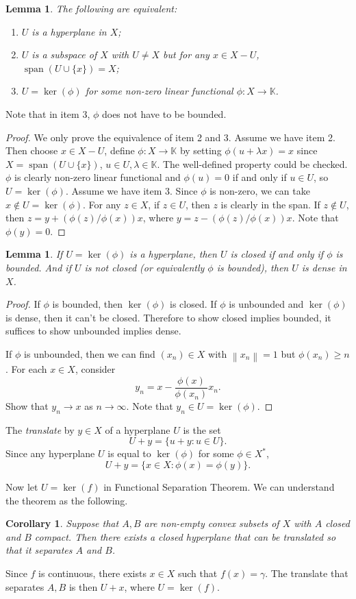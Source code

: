 \documentclass[12pt,a4paper]{report}
\numberwithin{equation}{section}
\theoremstyle{mystyle}
\newtheorem{lemma}[definition]{Lemma}
\newtheorem{corollary}[definition]{Corollary}
\newcommand{\K}{\mathbb{K}}
\newcommand{\norm}[1]{\left\lVert #1 \right\rVert}
\newcommand{\spn}{\operatorname{span}}
\begin{document}
	\begin{lemma}
		The following are equivalent:
		\begin{enumerate}
			\item $U$ is a hyperplane in $X$;
			\item $U$ is a subspace of $X$ with $U\neq X$ but for any $x\in X-U$, $\spn(U\cup \{x\})=X$;
			\item $U=\ker(\phi)$ for some non-zero linear functional $\phi:X\to\K$.
		\end{enumerate}
	\end{lemma}
	Note that in item 3, $\phi$ does not have to be bounded.
	\begin{proof}
		We only prove the equivalence of item 2 and 3. Assume we have item 2. Then choose $x\in X-U$, define $\phi:X\to\K$ by setting $\phi(u+\lambda x)=x$ since $X=\spn(U\cup \{x\})$, $u\in U, \lambda\in\K$. The well-defined property could be checked. $\phi$ is clearly non-zero linear functional and $\phi(u)=0$ if and only if $u\in U$, so $U=\ker(\phi)$. Assume we have item 3. Since $\phi$ is non-zero, we can take $x\notin U=\ker(\phi)$. For any $z\in X$, if $z\in U$, then $z$ is clearly in the span. If $z\notin U$, then $z=y+(\phi(z)/\phi(x))x$, where $y=z-(\phi(z)/\phi(x))x$. Note that $\phi(y)=0$.
	\end{proof}
	
	\begin{lemma}
		If $U=\ker(\phi)$ is a hyperplane, then $U$ is closed if and only if $\phi$ is bounded. And if $U$ is not closed (or equivalently $\phi$ is bounded), then $U$ is dense in $X$.
	\end{lemma}
	\begin{proof}
		If $\phi$ is bounded, then $\ker(\phi)$ is closed. If $\phi$ is unbounded and $\ker(\phi)$ is dense, then it can't be closed. Therefore to show closed implies bounded, it suffices to show unbounded implies dense.
		
		If $\phi$ is unbounded, then we can find $(x_n)\in X$ with $\norm{x_n}=1$ but $\phi(x_n)\geq n$. For each $x\in X$, consider
		$$
		y_n = x-\frac{\phi(x)}{\phi(x_n)}x_n.
		$$
		Show that $y_n\to x$ as $n\to \infty$. Note that $y_n\in U=\ker(\phi)$.
	\end{proof}
	
	The \emph{translate} by $y\in X$ of a hyperplane $U$ is the set
	$$
	U+y=\{u+y:u\in U\}.
	$$
	Since any hyperplane $U$ is equal to $\ker(\phi)$ for some $\phi\in X^*$, 
	$$
	U+y=\{x\in X:\phi(x)=\phi(y)\}.
	$$
		
	Now let $U=\ker(f)$ in Functional Separation Theorem. We can understand the theorem as the following.
	\begin{corollary}
		Suppose that $A,B$ are non-empty convex subsets of $X$ with $A$ closed and $B$ compact. Then there exists a closed hyperplane that can be translated so that it separates $A$ and $B$.
	\end{corollary}
	Since $f$ is continuous, there exists $x\in X$ such that $f(x)=\gamma$. The translate that separates $A,B$ is then $U+x$, where $U=\ker(f)$.
	
\end{document}
